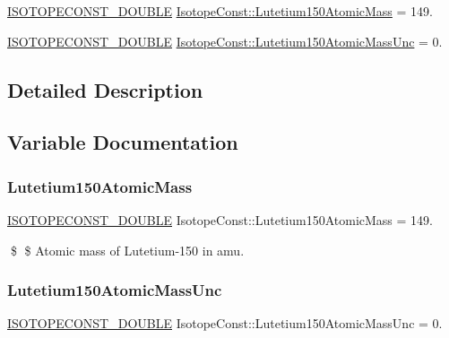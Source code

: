 \begin{DoxyCompactItemize}
\item 
\mbox{\hyperlink{group___isotope_const-_macros_ga8f45a7272ce02c0b4c65c44636ed719a}{I\+S\+O\+T\+O\+P\+E\+C\+O\+N\+S\+T\+\_\+\+D\+O\+U\+B\+LE}} \mbox{\hyperlink{group___isotope_const-_lutetium-_lu150_ga51a8fc1bc5d244cb3b52ff6c0c12469f}{Isotope\+Const\+::\+Lutetium150\+Atomic\+Mass}} = 149.
\item 
\mbox{\hyperlink{group___isotope_const-_macros_ga8f45a7272ce02c0b4c65c44636ed719a}{I\+S\+O\+T\+O\+P\+E\+C\+O\+N\+S\+T\+\_\+\+D\+O\+U\+B\+LE}} \mbox{\hyperlink{group___isotope_const-_lutetium-_lu150_gab7492fd47e6e5e5260453667955c6e2d}{Isotope\+Const\+::\+Lutetium150\+Atomic\+Mass\+Unc}} = 0.
\end{DoxyCompactItemize}


\subsection{Detailed Description}


\subsection{Variable Documentation}
\mbox{\label{group___isotope_const-_lutetium-_lu150_ga51a8fc1bc5d244cb3b52ff6c0c12469f}} 
\subsubsection{\texorpdfstring{Lutetium150\+Atomic\+Mass}{Lutetium150AtomicMass}}
{\footnotesize\ttfamily \mbox{\hyperlink{group___isotope_const-_macros_ga8f45a7272ce02c0b4c65c44636ed719a}{I\+S\+O\+T\+O\+P\+E\+C\+O\+N\+S\+T\+\_\+\+D\+O\+U\+B\+LE}} Isotope\+Const\+::\+Lutetium150\+Atomic\+Mass = 149.}

\$ \$ Atomic mass of Lutetium-\/150 in amu. \mbox{\label{group___isotope_const-_lutetium-_lu150_gab7492fd47e6e5e5260453667955c6e2d}} 
\subsubsection{\texorpdfstring{Lutetium150\+Atomic\+Mass\+Unc}{Lutetium150AtomicMassUnc}}
{\footnotesize\ttfamily \mbox{\hyperlink{group___isotope_const-_macros_ga8f45a7272ce02c0b4c65c44636ed719a}{I\+S\+O\+T\+O\+P\+E\+C\+O\+N\+S\+T\+\_\+\+D\+O\+U\+B\+LE}} Isotope\+Const\+::\+Lutetium150\+Atomic\+Mass\+Unc = 0.}

